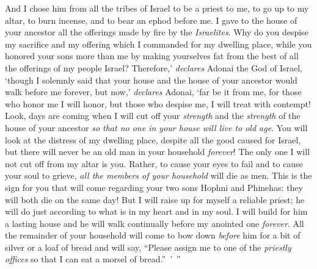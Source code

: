 \begin{biblechapter}
\verse And I chose him from all the tribes of Israel to be a priest to me, to go up to my altar, to burn incense, and to bear an ephod before me. I gave to the house of your ancestor all the offerings made by fire by the \textit{Israelites}.
\verse Why do you despise my sacrifice and my offering which I commanded for my dwelling place, while you honored your sons more than me by making yourselves fat from the best of all the offerings of my people Israel?
\verse Therefore,’ \textit{declares} Adonai the God of Israel, ‘though I solemnly said that your house and the house of your ancestor would walk before me forever, but now,’ \textit{declares} Adonai, ‘far be it from me, for those who honor me I will honor, but those who despise me, I will treat with contempt!
\verse Look, days are coming when I will cut off your \textit{strength} and the \textit{strength} of the house of your ancestor \textit{so that no one in your house will live to old age}.
\verse You will look at the distress of my dwelling place, despite all the good caused for Israel, but there will never be an old man in your household \textit{forever}!
\verse The only one I will not cut off from my altar is you. Rather, to cause your eyes to fail and to cause your soul to grieve, \textit{all the members of your household} will die as men.
\verse This is the sign for you that will come regarding your two sons Hophni and Phinehas: they will both die on the same day!
\verse But I will raise up for myself a reliable priest; he will do just according to what is in my heart and in my soul. I will build for him a lasting house and he will walk continually before my anointed one \textit{forever}.
\verse All the remainder of your household will come to bow down \textit{before} him for a bit of silver or a loaf of bread and will say, “Please assign me to one of the \textit{priestly offices} so that I can eat a morsel of bread.” ’ ”
\end{biblechapter}

